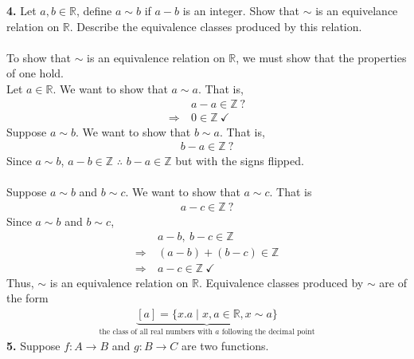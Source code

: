 \documentclass[12pt, letterpaper]{article}
\begin{document}
\textbf{4.} Let $a,b \in \mathbb{R}$, define $a \sim b$ if $a-b$ is an integer. Show that $\sim$ is an equivelance relation on $\mathbb{R}$. Describe the equivalence classes produced by this relation. \\ \\
 To show that $\sim$ is an equivalence relation on $\mathbb{R}$, we must show that the properties of one hold. \\
  Let $a \in \mathbb{R}$. We want to show that $a \sim a$. That is,
 \begin{align*}
     &a -a \in \mathbb{Z} \ ? \\
    \Rightarrow \ &0 \in \mathbb{Z} \ \checkmark
 \end{align*}
 Suppose $a \sim b$. We want to show that $b \sim a$. That is,
\begin{align*}
    b - a \in \mathbb{Z} \ ?
\end{align*}
Since $a \sim b$, $a-b \in \mathbb{Z}$ $\therefore$ $b-a \in \mathbb{Z}$ but with the signs flipped. \\ \\
 Suppose $a \sim b$ and $b \sim c$. We want to show that $a \sim c$. That is
\begin{align*}
    a - c \in \mathbb{Z} \ ?
\end{align*}
Since $a \sim b$ and $b \sim c$,
\begin{align*}
    &a-b, \ b-c \in \mathbb{Z}\\
    \Rightarrow \ &(a-b) + (b-c) \in \mathbb{Z} \\
    \Rightarrow \ &a-c \in \mathbb{Z} \ \checkmark
\end{align*}
Thus, $\sim$ is an equivalence relation on $\mathbb{R}$.
 Equivalence classes produced by $\sim$ are of the form 
\begin{align*}
    \underbrace{[a] = \{x.a \mid x,a \in \mathbb{R}, x \sim a\}}_{\text{the class of all real numbers with $a$ following the decimal point}}
\end{align*} 
\textbf{5.} Suppose $f : A \xrightarrow{} B$ and $g: B \xrightarrow{}C$ are two functions. \\
\end{document}
